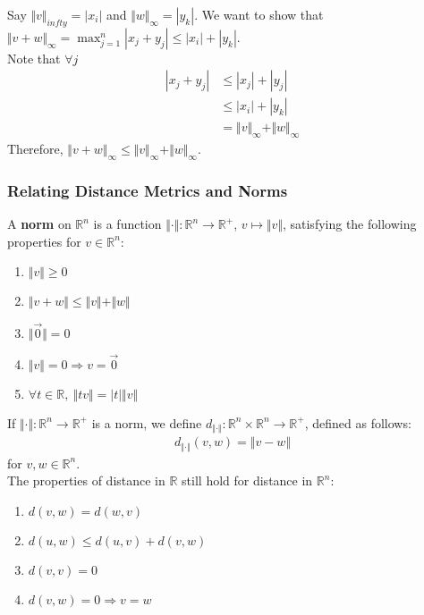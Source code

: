 \documentclass[10pt]{extarticle}
\newcommand{\R}{\mathbb{R}}
\begin{document}
      Say $\Vert v \Vert_{infty} = |x_i|$ and $\Vert w \Vert_{\infty} = |y_k|$. We want to show that $\Vert v + w \Vert_{\infty} = \max_{j=1}^{n}|x_j + y_j| \leq |x_i| + |y_k|$.\\

      Note that $\forall j$
      \begin{align*}
        |x_j + y_j| &\leq |x_j| + |y_j| \tag*{Triangle Inequality}\\
                    &\leq |x_i| + |y_k| \\
                    &= \Vert v \Vert_{\infty} + \Vert w \Vert_{\infty}
      \end{align*}
      Therefore, $\Vert v + w \Vert_{\infty} \leq \Vert v \Vert_{\infty} + \Vert w \Vert_{\infty}$.
    \subsubsection{Relating Distance Metrics and Norms}%
    A \textbf{norm} on $\R^n$ is a function $\Vert \cdot \Vert: \R^n \rightarrow \R^+$, $v\mapsto \Vert v \Vert$, satisfying the following properties for $v\in\R^n$:
    \begin{enumerate}[(1)]
      \item $\Vert v \Vert \geq 0$
      \item $\Vert v + w \Vert \leq \Vert v \Vert + \Vert w \Vert$
      \item $\Vert \vec{0}\Vert = 0$
      \item $\Vert v \Vert = 0\Rightarrow v = \vec{0}$
      \item $\forall t\in\R,~\Vert tv \Vert = |t|\Vert v\Vert$
    \end{enumerate}
    If $\Vert \cdot \Vert: \R^n \rightarrow \R^+$ is a norm, we define $d_{\Vert \cdot \Vert}: \R^n \times \R^n \rightarrow \R^+$, defined as follows:
    \begin{align*}
      d_{\Vert \cdot \Vert}(v,w) = \Vert v-w \Vert
    \end{align*}
    for $v,w\in\R^n$.\\

    The properties of distance in $\R$ still hold for distance in $\R^n$:
    \begin{enumerate}[(1)]
      \item $d(v,w) = d(w,v)$
      \item $d(u,w) \leq d(u,v) + d(v,w)$
      \item $d(v,v) = 0$
      \item $d(v,w) = 0 \Rightarrow v=w$
    \end{enumerate}
\end{document}
